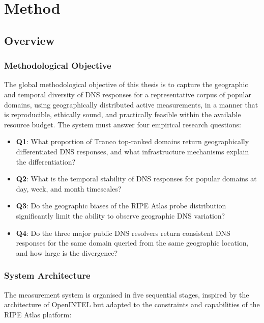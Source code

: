 \chapter{Method}
\label{ch:method}

\section{Overview}
\label{sec:3.1}

\subsection{Methodological Objective}
\label{subsec:3.1.1}

The global methodological objective of this thesis is to capture the geographic and temporal diversity of \ac{DNS} responses for a representative corpus of popular domains, using geographically distributed active measurements, in a manner that is reproducible, ethically sound, and practically feasible within the available resource budget. The system must answer four empirical research questions:

\begin{itemize}
  \item \textbf{Q1}: What proportion of Tranco top-ranked domains return geographically differentiated \ac{DNS} responses, and what infrastructure mechanisms explain the differentiation?
  \item \textbf{Q2}: What is the temporal stability of \ac{DNS} responses for popular domains at day, week, and month timescales?
  \item \textbf{Q3}: Do the geographic biases of the RIPE Atlas probe distribution significantly limit the ability to observe geographic \ac{DNS} variation?
  \item \textbf{Q4}: Do the three major public \ac{DNS} resolvers return consistent \ac{DNS} responses for the same domain queried from the same geographic location, and how large is the divergence?
\end{itemize}

\subsection{System Architecture}
\label{subsec:3.1.2}

The measurement system is organised in five sequential stages, inspired by the architecture of OpenINTEL \cite{vanRijswijk2016} but adapted to the constraints and capabilities of the RIPE Atlas platform:


